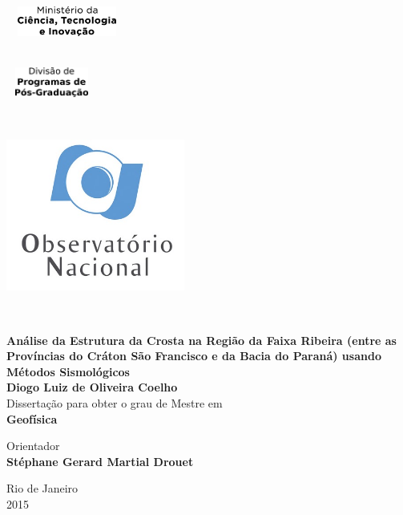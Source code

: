 \setcounter{page}{1} 


\thispagestyle{empty}
\begin{flushleft} ~\\ \vspace{-10mm} \hspace{-5mm}  \includegraphics[width=40mm, height=10mm]{mcti} 
\begin{flushright}~\\ \vspace{-20mm} \hspace{-9mm}  \includegraphics[width=30mm, height=10mm]{dppg} 
\end{flushright}


~\\ \begin{center} \includegraphics[height=50mm]{logo_on}  \end{center} %
~\\ \vspace{5mm}
\begin{centering}
\LARGE \textbf{Análise da Estrutura da Crosta na Região da Faixa Ribeira (entre as Províncias do Cráton São Francisco e da Bacia do Paraná) usando
Métodos Sismológicos}
\\ \vspace{20mm}
\Large \textbf{Diogo Luiz de Oliveira Coelho} \\
\vspace{20mm}
\Large Dissertação para obter o grau de Mestre em
\\ \vspace{2mm}
\LARGE \textbf{Geofísica}
\\ \vspace{20mm}

\Large Orientador\\
\textbf{Stéphane Gerard Martial Drouet} \\

 
\vspace{20mm}

Rio de Janeiro \\
2015 \\
\end{centering}
\let\thepage\relax
\end{flushleft}
\pagebreak